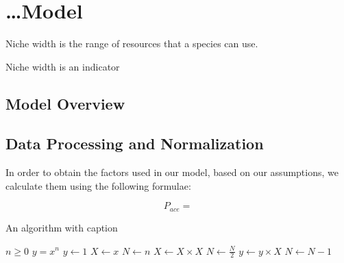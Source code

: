 \section{\ldots Model}
\begin{definition}
    Niche width is the range of resources that a species can use.
\end{definition}
Niche width is an indicator \cite{Alice13}

\subsection{Model Overview}

\subsection{Data Processing and Normalization}
In order to obtain the factors used in our model, based on our assumptions, we calculate them using the following formulae: \par
\begin{equation}
    P_{ace} = 
\end{equation}

\begin{algorithm}
    \caption{An algorithm with caption}\label{alg:cap}
    \begin{algorithmic}
    \Require $n \geq 0$
    \Ensure $y = x^n$
    \State $y \gets 1$
    \State $X \gets x$
    \State $N \gets n$
        \State $X \gets X \times X$
        \State $N \gets \frac{N}{2}$  
        \State $y \gets y \times X$
        \State $N \gets N - 1$
    \EndIf
    \EndWhile
    \end{algorithmic}
\end{algorithm}
